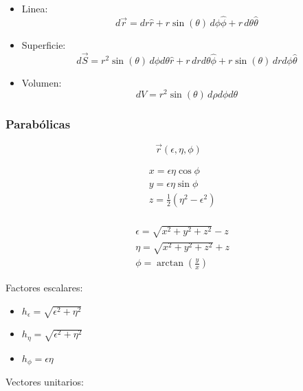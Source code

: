 \begin{itemize}
    \item Linea:
    \[d\vec{r} = dr\hat{r} + r\sin(\theta)\, d\phi\hat{\phi}+r\,d\theta\hat{\theta}\]
    \item Superficie:
    \[d\vec{S} = r^2\sin(\theta)\,d\phi d\theta\hat{r}+r\,drd\theta\hat{\phi}+r\sin(\theta)\,dr d\phi\hat{\theta}\]
    \item Volumen:
    \[dV = r^2\sin(\theta)\,d\rho d\phi d\theta\]
\end{itemize}

\newpage
\subsubsection{Parabólicas}

\[\Vec{r}(\epsilon,\eta,\phi)\]

\begin{minipage}{0.55\textwidth}
\begin{equation}
\begin{split}
    &x = \epsilon\eta\cos{\phi}\\
    &y = \epsilon\eta\sin{\phi}\\
    &z = \frac{1}{2}(\eta^2-\epsilon^2)\\
\end{split}
\nonumber
\end{equation}
\end{minipage}
\begin{minipage}{0.35\textwidth}
\begin{equation}
\begin{split}
    & \epsilon = \sqrt{x^2+y^2+z^2}-z\\
    & \eta = \sqrt{x^2+y^2+z^2}+z\\
    & \phi = \arctan{\left(\frac{y}{x}\right)}
\end{split}
\nonumber
\end{equation}
\end{minipage}

\bigbreak
Factores escalares:
\begin{itemize}
    \item $h_\epsilon = \sqrt{\epsilon^2+\eta^2}$
    \item $h_\eta = \sqrt{\epsilon^2+\eta^2}$
    \item $h_\phi = \epsilon\eta$
\end{itemize}
\bigbreak
Vectores unitarios:

